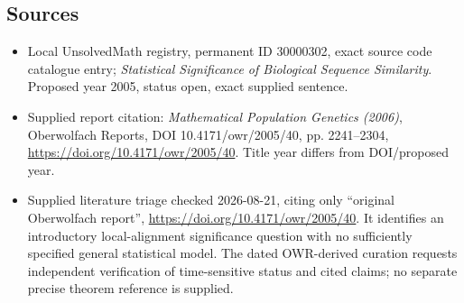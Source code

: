 \documentclass[11pt]{article}
\begin{document}
\subsection{Sources}
\begin{itemize}
\item Local UnsolvedMath registry, permanent ID 30000302, exact source code catalogue entry; \emph{Statistical Significance of Biological Sequence Similarity}. Proposed year 2005, status open, exact supplied sentence.
\item Supplied report citation: \emph{Mathematical Population Genetics (2006)}, Oberwolfach Reports, DOI 10.4171/owr/2005/40, pp. 2241--2304, \url{https://doi.org/10.4171/owr/2005/40}. Title year differs from DOI/proposed year.
\item Supplied literature triage checked 2026-08-21, citing only ``original Oberwolfach report'', \url{https://doi.org/10.4171/owr/2005/40}. It identifies an introductory local-alignment significance question with no sufficiently specified general statistical model. The dated OWR-derived curation requests independent verification of time-sensitive status and cited claims; no separate precise theorem reference is supplied.
\end{itemize}
\end{document}
